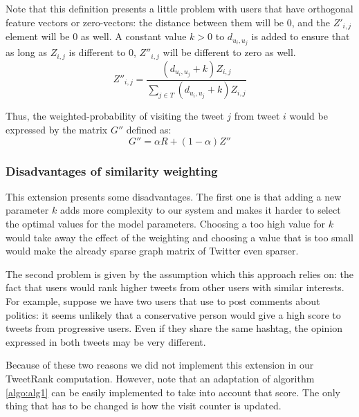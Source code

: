 Note that this definition presents a little problem with users that have orthogonal feature vectors or zero-vectors: the distance between them will be 0, and the $Z'_{i,j}$ element will be 0 as well. A constant value $k > 0$ to $d_{u_i,u_j}$ is added to ensure that as long as $Z_{i,j}$ is different to 0, $Z''_{i,j}$ will be different to zero as well.
\begin{equation}
Z''_{i,j} = \frac{ (d_{u_i,u_j} + k) Z_{i,j}}{\sum_{j \in T}{(d_{u_i,u_j} + k) Z_{i,j}}}
\end{equation}

Thus, the weighted-probability of visiting the tweet $j$ from tweet $i$ would be expressed by the matrix $G''$ defined as:
\begin{equation}
G'' = \alpha R + (1 - \alpha) Z''
\end{equation}

\subsubsection*{Disadvantages of similarity weighting}
This extension presents some disadvantages. The first one is that adding a new parameter $k$ adds more complexity to our system and makes it harder to select the optimal values for the model parameters. Choosing a too high value for $k$ would take away the effect of the weighting and choosing a value that is too small would make the already sparse graph matrix of Twitter even sparser.

The second problem is given by the assumption which this approach relies on: the fact that users would rank higher tweets from other users with similar interests. For example, suppose we have two users that use to post comments about politics: it seems unlikely that a conservative person would give a high score to tweets from progressive users. Even if they share the same hashtag, the opinion expressed in both tweets may be very different.

Because of these two reasons we did not implement this extension in our TweetRank computation. However, note that an adaptation of algorithm \ref{algo:alg1} can be easily implemented to take into account that score. The only thing that has to be changed is how the visit counter is updated.
